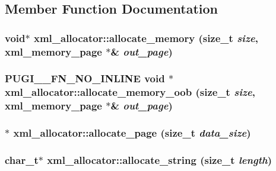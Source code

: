 \subsection{Member Function Documentation}
\hypertarget{structxml__allocator_afac0b9fac2c2962972f60d0346eb4f39}{
\subsubsection[{allocate\_\-memory}]{\setlength{\rightskip}{0pt plus 5cm}void$\ast$ xml\_\-allocator::allocate\_\-memory (size\_\-t {\em size}, \/  {\bf xml\_\-memory\_\-page} $\ast$\& {\em out\_\-page})}}
\label{structxml__allocator_afac0b9fac2c2962972f60d0346eb4f39}
\hypertarget{structxml__allocator_a30bb557bc040de54c041c6d3dca6772e}{
\subsubsection[{allocate\_\-memory\_\-oob}]{\setlength{\rightskip}{0pt plus 5cm}PUGI\_\-\_\-FN\_\-NO\_\-INLINE void $\ast$ xml\_\-allocator::allocate\_\-memory\_\-oob (size\_\-t {\em size}, \/  {\bf xml\_\-memory\_\-page} $\ast$\& {\em out\_\-page})}}
\label{structxml__allocator_a30bb557bc040de54c041c6d3dca6772e}
\hypertarget{structxml__allocator_a4b399b01e530220ec5849b912b84063b}{
\subsubsection[{allocate\_\-page}]{$\ast$ xml\_\-allocator::allocate\_\-page (size\_\-t {\em data\_\-size})}}
\label{structxml__allocator_a4b399b01e530220ec5849b912b84063b}
\hypertarget{structxml__allocator_ac5ec2b5d41672d6494a2742e95e525b3}{
\subsubsection[{allocate\_\-string}]{\setlength{\rightskip}{0pt plus 5cm}char\_\-t$\ast$ xml\_\-allocator::allocate\_\-string (size\_\-t {\em length})}}
